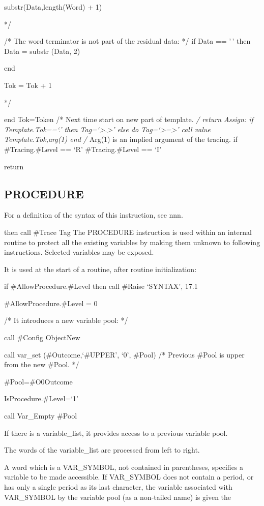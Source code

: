 substr(Data,length(Word) + 1)

*/

/* The word terminator is not part of the residual data: */ if Data ==
'\,' then Data = substr (Data, 2)

end

Tok = Tok + 1

*/

end Tok=Token /* Next time start on new part of template. \emph{/ return
Assign: if Template.Tok==`.' then Tag=`\textgreater.\textgreater{}' else
do Tag=`\textgreater=\textgreater{}' call value Template.Tok,arg(1) end
/} Arg(1) is an implied argument of the tracing. if \#Tracing.\#Level ==
`R' \textbar{} \#Tracing.\#Level == `I'

return

\hypertarget{procedure}{%
\subsection{PROCEDURE}\label{procedure}}

For a definition of the syntax of this instruction, see nnn.

then call \#Trace Tag The PROCEDURE instruction is used within an
internal routine to protect all the existing variables by making them
unknown to following instructions. Selected variables may be exposed.

It is used at the start of a routine, after routine initialization:

if \#AllowProcedure.\#Level then call \#Raise `SYNTAX', 17.1

\#AllowProcedure.\#Level = 0

/* It introduces a new variable pool: */

call \#Config ObjectNew

call var\_set (\#Outcome,`\#UPPER', `0', \#Pool) /* Previous \#Pool is
upper from the new \#Pool. */

\#Pool=\#O0Outcome

IsProcedure.\#Level=`1'

call Var\_Empty \#Pool

If there is a variable\_list, it provides access to a previous variable
pool.

The words of the variable\_list are processed from left to right.

A word which is a VAR\_SYMBOL, not contained in parentheses, specifies a
variable to be made accessible. If VAR\_SYMBOL does not contain a
period, or has only a single period as its last character, the variable
associated with VAR\_SYMBOL by the variable pool (as a non-tailed name)
is given the

